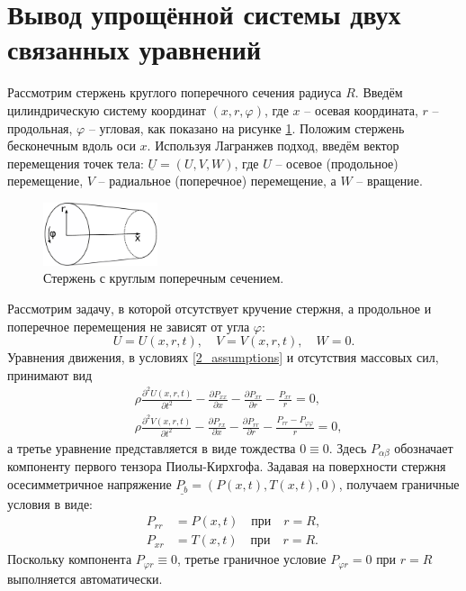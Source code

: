 \documentclass[12pt, a4paper]{article}
\newcommand{\vect}[1]{\underline{#1}}
\begin{document}
\section{Вывод упрощённой системы двух связанных уравнений}

Рассмотрим стержень круглого поперечного сечения радиуса $R$. Введём цилиндрическую систему координат $(x, r, \varphi)$, где $x$ -- осевая координата, $r$ -- продольная, $\varphi$ -- угловая, как показано на рисунке \ref{fig:rod}. Положим стержень бесконечным вдоль оси $x$. Используя Лагранжев подход, введём вектор перемещения точек тела: $\vect{U} = (U, V, W)$, где $U$ -- осевое (продольное) перемещение, $V$ -- радиальное (поперечное) перемещение, а $W$ -- вращение.
\begin{figure}[h]
	\centering
	\includegraphics[width=0.3\textwidth]{1_RodSchematic}
	\caption{Стержень с круглым поперечным сечением.}
	\label{fig:rod}
\end{figure}

Рассмотрим задачу, в которой отсутствует кручение стержня, а продольное и поперечное перемещения не зависят от угла $\varphi$:
\begin{equation}\label{2_assumptions}
U = U(x,r,t), \quad V = V(x,r,t), \quad W = 0.
\end{equation}
Уравнения движения, в условиях \eqref{2_assumptions} и отсутствия массовых сил, принимают вид
\begin{align}
\label{2_eq1_0}
&\rho  \frac{\partial^2 U(x,r,t)}{\partial t^2}-\frac{\partial P_{x x}}{\partial x}-\frac{\partial P_{xr}}{\partial r}-\frac{P_{xr}}{r} = 0,\\
\label{2_eq2_0}
&\rho  \frac{\partial^2 V(x,r,t)}{\partial t^2} - \frac{\partial P_{rx}}{\partial x}-\frac{\partial P_{rr}}{\partial r}-\frac{P_{rr} - P_{\varphi\varphi}}{r} = 0,
\end{align}
а третье уравнение представляется в виде тождества $0\equiv 0$. Здесь $P_{\alpha \beta}$ обозначает компоненту первого тензора Пиолы-Кирхгофа. Задавая на поверхности стержня осесимметричное напряжение $\vect{P_b} = (P(x,t), T(x,t), 0)$, получаем граничные условия в виде:
\begin{align}
P_{rr} &= P(x, t) \quad \mbox{при} \quad r = R \label{2_bc_rr},\\
P_{xr} &= T(x, t) \quad \mbox{при} \quad r = R \label{2_bc_rx}.
\end{align}
Поскольку компонента $ P_{\varphi r} \equiv 0 $, третье граничное условие $P_{\varphi r} = 0$ при $r = R$ выполняется автоматически.
\end{document}
